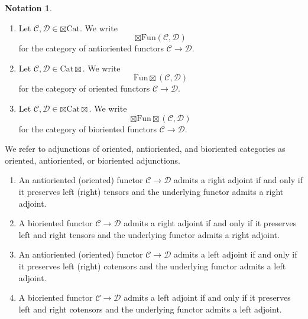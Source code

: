 \documentclass[10pt,oneside]{article}
\numberwithin{equation}{section} %
\numberwithin{figure}{section} %
\theoremstyle{plain}
\theoremstyle{definition}
\newtheorem{notation}[thm]{Notation}
\newcommand{\mC}{{\mathcal C}}
\newcommand{\mD}{{\mathcal D}}
\newcommand{\Cat}{\mathrm{Cat}}
\newcommand{\Fun}{\mathrm{Fun}}
\begin{document}
\begin{notation}
\begin{enumerate}[\normalfont(1)]\setlength{\itemsep}{-2pt}
\item Let $\mC,\mD \in \boxtimes\Cat$. We write $${\boxtimes\Fun}(\mC,\mD)$$ for the category of antioriented functors $\mC \to \mD.$	
		
\item Let $\mC,\mD \in \Cat\boxtimes$. We write $${\Fun\boxtimes}(\mC,\mD)$$ for the category of oriented functors $\mC \to \mD.$	
		
\item Let $\mC,\mD \in \boxtimes\Cat\boxtimes $. We write $${\boxtimes\Fun\boxtimes}(\mC,\mD)$$ for the category of bioriented functors $\mC \to \mD.$		

\end{enumerate}
\end{notation}



\begin{remark}
We refer to adjunctions of oriented, antioriented, and bioriented categories as oriented, antioriented, or bioriented adjunctions.
\end{remark}

\begin{remark}\label{adj2}
\begin{enumerate}[\normalfont(1)]\setlength{\itemsep}{-2pt}
\item An antioriented (oriented) functor $\mC \to \mD$ admits a right adjoint if and only if it preserves left (right) tensors and the underlying functor admits a right adjoint.

\item A bioriented functor $\mC \to \mD$ admits a right adjoint if and only if it preserves left and right tensors and the underlying functor admits a right adjoint.

\item An antioriented (oriented) functor $\mC \to \mD$ admits a left adjoint if and only if it preserves left (right) cotensors and the underlying functor admits a left adjoint.
	
\item A bioriented functor $\mC \to \mD$ admits a left adjoint if and only if it preserves left and right cotensors and the underlying functor admits a left adjoint.

\end{enumerate}

\end{remark}
\end{document}
